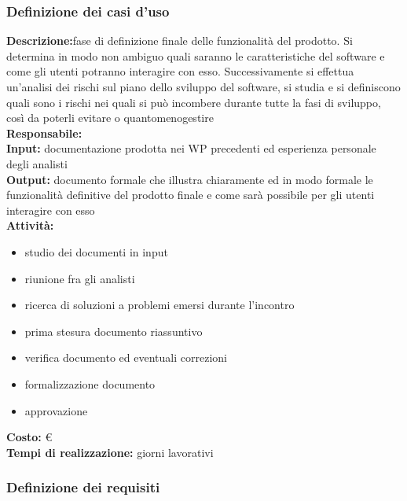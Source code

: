 \subsubsection{Definizione dei casi d'uso}
\textbf{Descrizione:}fase di definizione finale delle funzionalità del prodotto. Si determina
in modo non ambiguo quali saranno le caratteristiche del software e come gli utenti
potranno interagire con esso. Successivamente si effettua un’analisi dei rischi sul piano dello sviluppo
del software, si studia e si definiscono quali sono i rischi nei quali si
può incombere durante tutte la fasi di sviluppo, così da poterli evitare o quantomenogestire\\
\linebreak
\textbf{Responsabile:} \\
\linebreak
\textbf{Input: }documentazione prodotta nei WP precedenti ed esperienza personale degli
analisti\\
\linebreak
\textbf{Output:} documento formale che illustra chiaramente ed in modo formale le funzionalità
definitive del prodotto finale e come sarà possibile per gli utenti interagire con esso\\
\linebreak
\textbf{Attività:}
\begin{itemize}
\item studio dei documenti in input
\item riunione fra gli analisti
\item ricerca di soluzioni a problemi emersi durante l’incontro
\item prima stesura documento riassuntivo
\item verifica documento ed eventuali correzioni
\item formalizzazione documento
\item approvazione
\end{itemize}

\textbf{Costo:} \euro \\
\textbf{Tempi di realizzazione:}  giorni lavorativi



\subsubsection{Definizione dei requisiti}

